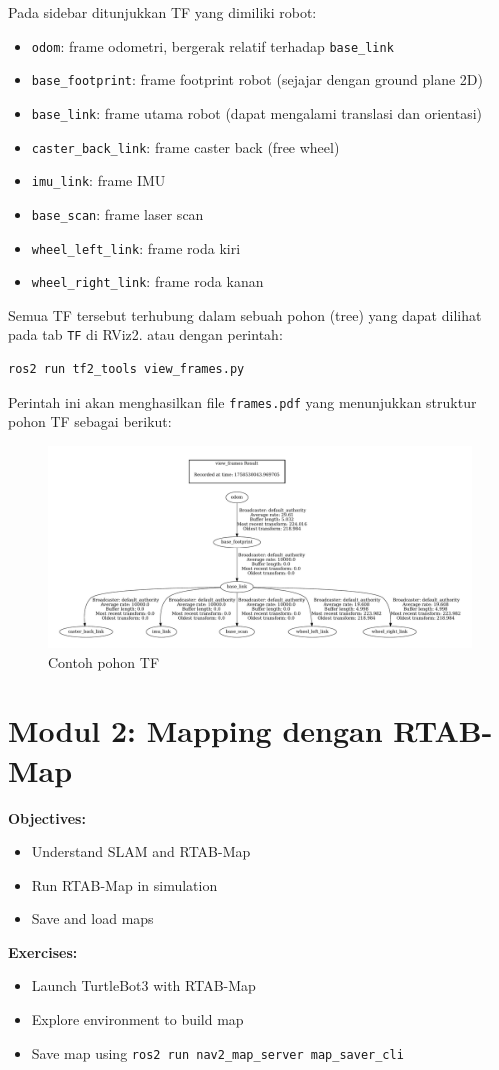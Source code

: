 \documentclass{article}
\begin{document}
Pada sidebar ditunjukkan TF yang dimiliki robot:
\begin{itemize}
  \item \texttt{odom}: frame odometri, bergerak relatif terhadap \texttt{base\_link}
  \item \texttt{base\_footprint}: frame footprint robot (sejajar dengan ground plane 2D)
  \item \texttt{base\_link}: frame utama robot (dapat mengalami translasi dan orientasi)
  \item \texttt{caster\_back\_link}: frame caster back (free wheel)
  \item \texttt{imu\_link}: frame IMU
  \item \texttt{base\_scan}: frame laser scan
  \item \texttt{wheel\_left\_link}: frame roda kiri
  \item \texttt{wheel\_right\_link}: frame roda kanan
\end{itemize}
Semua TF tersebut terhubung dalam sebuah pohon (tree) yang dapat dilihat pada tab \texttt{TF} di RViz2. atau dengan perintah:
\begin{verbatim}
ros2 run tf2_tools view_frames.py
\end{verbatim}
Perintah ini akan menghasilkan file \texttt{frames.pdf} yang menunjukkan struktur pohon TF sebagai berikut:
\begin{figure}[H]
  \centering
  \includegraphics[width=1\textwidth]{tf_tree.png}
  \caption{Contoh pohon TF}
\end{figure}


\section{Modul 2: Mapping dengan RTAB-Map}
\textbf{Objectives:}
\begin{itemize}
  \item Understand SLAM and RTAB-Map
  \item Run RTAB-Map in simulation
  \item Save and load maps
\end{itemize}
\textbf{Exercises:}
\begin{itemize}
  \item Launch TurtleBot3 with RTAB-Map
  \item Explore environment to build map
  \item Save map using \texttt{ros2 run nav2\_map\_server map\_saver\_cli}
\end{itemize}
\end{document}
